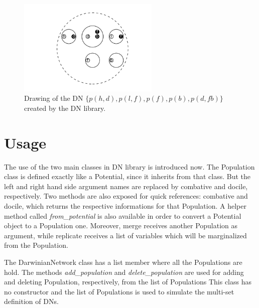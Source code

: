 \begin{figure}[hbt]
    \begin{center}
        \includegraphics[width=0.6\textwidth]{img/drawing_dn.png}
    \end{center}
    \caption{Drawing of the DN $\{p(h,d), p(l,f), p(f), p(b), p(d,fb)\}$ created by the DN library.}
    \label{fig:drawing_dn}
\end{figure}

\section{Usage}
\label{sec:system:sec3}

The use of the two main classes in DN library is introduced now.
The Population class is defined exactly like a Potential, since it inherits from that class.
But the left and right hand side argument names are replaced by combative and docile, respectively.
Two methods are also exposed for quick references: combative and docile, which returns the respective informations for that Population.
A helper method called \emph{from\_potential} is also available in order to convert a Potential object to a Population one.
Moreover, merge receives another Population as argument, while replicate receives a list of variables which will be marginalized from the Population.

The DarwinianNetwork class has a list member where all the Populations are hold.
The methods \emph{add\_population} and \emph{delete\_population} are used for adding and deleting Population, respectively, from the list of Populations
This class has no constructor and the list of Populations is used to simulate the multi-set definition of DNs.
